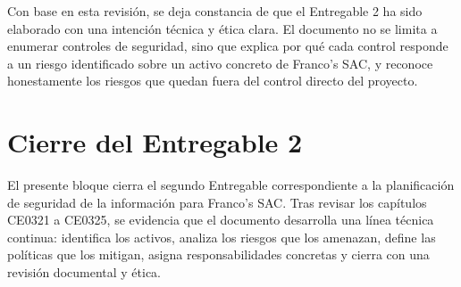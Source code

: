 \documentclass[11pt, a4paper, oneside]{report}
\begin{document}
\normalsize

Con base en esta revisión, se deja constancia de que el Entregable 2 ha sido elaborado con una intención técnica y ética clara. El documento no se limita a enumerar controles de seguridad, sino que explica por qué cada control responde a un riesgo identificado sobre un activo concreto de Franco's SAC, y reconoce honestamente los riesgos que quedan fuera del control directo del proyecto.

\section{Cierre del Entregable 2}

El presente bloque cierra el segundo Entregable correspondiente a la planificación de seguridad de la información para Franco's SAC. Tras revisar los capítulos CE0321 a CE0325, se evidencia que el documento desarrolla una línea técnica continua: identifica los activos, analiza los riesgos que los amenazan, define las políticas que los mitigan, asigna responsabilidades concretas y cierra con una revisión documental y ética.

\renewcommand{\arraystretch}{1.3}
\footnotesize
{}
\end{document}
